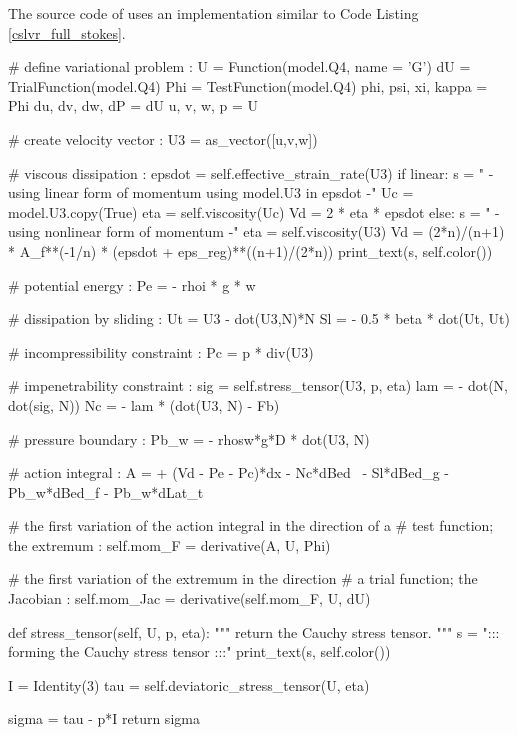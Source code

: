 The source code of \CSLVR uses an implementation similar to Code Listing \ref{cslvr_full_stokes}.

\begin{python}[label=cslvr_full_stokes, caption={\CSLVR source code contained in the \texttt{MomentumDukowiczStokes} class.}]
# define variational problem :
U                    = Function(model.Q4, name = 'G')
dU                   = TrialFunction(model.Q4)
Phi                  = TestFunction(model.Q4)
phi, psi, xi,  kappa = Phi
du,  dv,  dw,  dP    = dU
u,   v,   w,   p     = U

# create velocity vector :
U3      = as_vector([u,v,w])

# viscous dissipation :
epsdot  = self.effective_strain_rate(U3)
if linear:
  s   = "    - using linear form of momentum using model.U3 in epsdot -"
  Uc  = model.U3.copy(True)
  eta = self.viscosity(Uc)
  Vd  = 2 * eta * epsdot
else:
  s   = "    - using nonlinear form of momentum -"
  eta = self.viscosity(U3)
  Vd  = (2*n)/(n+1) * A_f**(-1/n) * (epsdot + eps_reg)**((n+1)/(2*n))
print_text(s, self.color())

# potential energy :
Pe     = - rhoi * g * w

# dissipation by sliding :
Ut     = U3 - dot(U3,N)*N
Sl     = - 0.5 * beta * dot(Ut, Ut)

# incompressibility constraint :
Pc     = p * div(U3)

# impenetrability constraint :
sig    = self.stress_tensor(U3, p, eta)
lam    = - dot(N, dot(sig, N))
Nc     = - lam * (dot(U3, N) - Fb)

# pressure boundary :
Pb_w   = - rhosw*g*D * dot(U3, N)

# action integral :
A      = + (Vd - Pe - Pc)*dx - Nc*dBed \
         - Sl*dBed_g - Pb_w*dBed_f - Pb_w*dLat_t

# the first variation of the action integral in the direction of a 
# test function; the extremum :
self.mom_F = derivative(A, U, Phi)

# the first variation of the extremum in the direction 
# a trial function; the Jacobian :
self.mom_Jac = derivative(self.mom_F, U, dU)

def stress_tensor(self, U, p, eta):
  """
  return the Cauchy stress tensor.
  """
  s   = "::: forming the Cauchy stress tensor :::"
  print_text(s, self.color())

  I     = Identity(3)
  tau   = self.deviatoric_stress_tensor(U, eta)

  sigma = tau - p*I
  return sigma


\end{python}
